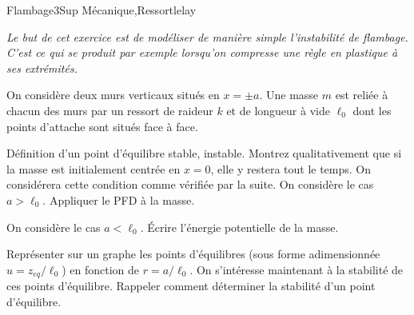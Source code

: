 
\begin{exercise}{Flambage}{3}{Sup}
{Mécanique,Ressort}{lelay}

\textsl{Le but de cet exercice est de modéliser de manière simple l'instabilité de flambage. C'est ce qui se produit par exemple lorsqu'on compresse une règle en plastique à ses extrémités.}

On considère deux murs verticaux situés en $x = \pm a$. Une masse $m$ est reliée à chacun des murs par un ressort de raideur $k$ et de longueur à vide $\ell_0$ dont les points d'attache sont situés face à face.
\begin{questions}
    \questioncours Définition d'un point d'équilibre stable, instable.
    \question Montrez qualitativement que si la masse est initialement centrée en $x=0$, elle y restera tout le temps. On considérera cette condition comme vérifiée par la suite.
    \question On considère le cas $a > \ell_0$. Appliquer le PFD à la masse.
    \question On considère le cas $a < \ell_0$. Écrire l'énergie potentielle de la masse.
    \question Représenter sur un graphe les points d'équilibres (sous forme adimensionnée $u=z_{eq}/\ell_0$) en fonction de $r = a/\ell_0$.
    \question On s'intéresse maintenant à la stabilité de ces points d'équilibre. Rappeler comment déterminer la stabilité d'un point d'équilibre. 
    \begin{parts}

\end{parts}
\end{questions}
\end{exercise}
